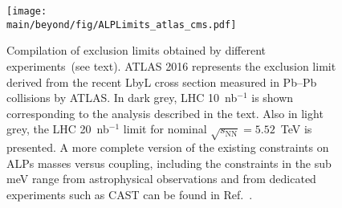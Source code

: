 \begin{figure}[!htbp]
\centering
  \texttt{[image: \\main/beyond/fig/ALPLimits\_atlas\_cms.pdf]}
  \caption{Compilation of exclusion limits obtained by different experiments~(see text).
  ATLAS 2016 represents the exclusion limit derived from the recent LbyL cross section measured in Pb--Pb collisions by ATLAS.
  In dark grey, LHC 10~nb$^{-1}$ is shown corresponding to the analysis described in the text. Also in light grey, the LHC 20~nb$^{-1}$ limit for nominal $\sqrt{s_{\mathrm{NN}}}=5.52$~TeV is presented. A more complete version of the existing constraints on ALPs masses versus coupling, including the constraints in the sub meV range from astrophysical observations and
  from dedicated experiments such as CAST can be found in Ref.~\cite{Bauer:2017ris}.}
  \label{fig:alp-lambda-limits}
\end{figure}

